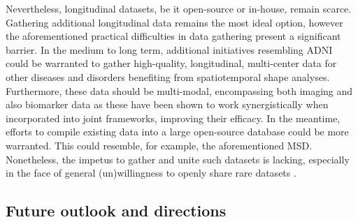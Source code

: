 		Nevertheless, longitudinal datasets, be it open-source or in-house, remain scarce. Gathering additional longitudinal data remains the most ideal option, however the aforementioned practical difficulties in data gathering present a significant barrier. In the medium to long term, additional initiatives resembling ADNI could be warranted to gather high-quality, longitudinal, multi-center data for other diseases and disorders benefiting from spatiotemporal shape analyses. Furthermore, these data should be multi-modal, encompassing both imaging and also biomarker data as these have been shown to work synergistically when incorporated into joint frameworks, improving their efficacy. In the meantime, efforts to compile existing data into a large open-source database could be more warranted. This could resemble, for example, the aforementioned MSD. Nonetheless, the impetus to gather and unite such datasets is lacking, especially in the face of general (un)willingness to openly share rare datasets \cite{Tedersoo2021}. 
		

	\subsection{Future outlook and directions}
	
